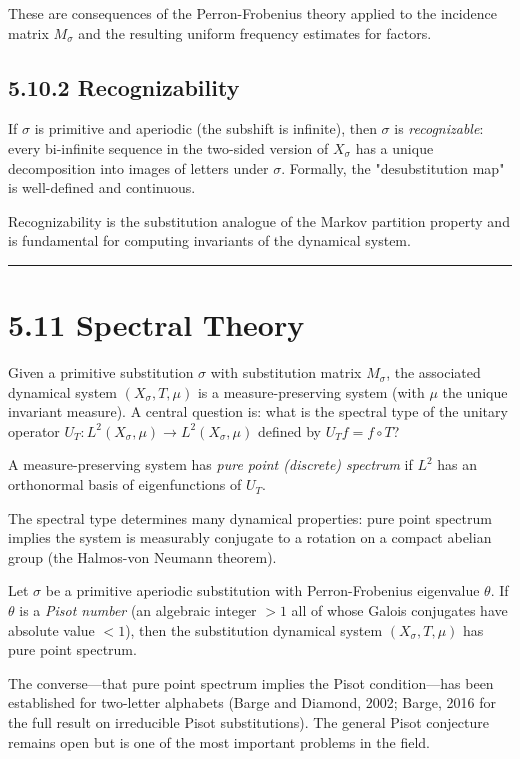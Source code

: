 These are consequences of the Perron-Frobenius theory applied to the incidence matrix $M_\sigma$ and the resulting uniform frequency estimates for factors.

\subsection{5.10.2 Recognizability}

\begin{theorem}[Mossé 1992]
If $\sigma$ is primitive and aperiodic (the subshift is infinite), then $\sigma$ is \textit{recognizable}: every bi-infinite sequence in the two-sided version of $X_\sigma$ has a unique decomposition into images of letters under $\sigma$. Formally, the "desubstitution map" is well-defined and continuous.

Recognizability is the substitution analogue of the Markov partition property and is fundamental for computing invariants of the dynamical system.

\bigskip\hrule\bigskip
\end{theorem}

\section{5.11 Spectral Theory}

Given a primitive substitution $\sigma$ with substitution matrix $M_\sigma$, the associated dynamical system $(X_\sigma, T, \mu)$ is a measure-preserving system (with $\mu$ the unique invariant measure). A central question is: what is the spectral type of the unitary operator $U_T: L^2(X_\sigma, \mu) \to L^2(X_\sigma, \mu)$ defined by $U_T f = f \circ T$?

\begin{definition}
A measure-preserving system has \textit{pure point (discrete) spectrum} if $L^2$ has an orthonormal basis of eigenfunctions of $U_T$.

The spectral type determines many dynamical properties: pure point spectrum implies the system is measurably conjugate to a rotation on a compact abelian group (the Halmos-von Neumann theorem).
\end{definition}

\begin{theorem}
Let $\sigma$ be a primitive aperiodic substitution with Perron-Frobenius eigenvalue $\theta$. If $\theta$ is a \textit{Pisot number} (an algebraic integer $> 1$ all of whose Galois conjugates have absolute value $< 1$), then the substitution dynamical system $(X_\sigma, T, \mu)$ has pure point spectrum.

The converse---that pure point spectrum implies the Pisot condition---has been established for two-letter alphabets (Barge and Diamond, 2002; Barge, 2016 for the full result on irreducible Pisot substitutions). The general Pisot conjecture remains open but is one of the most important problems in the field.
\end{theorem}

